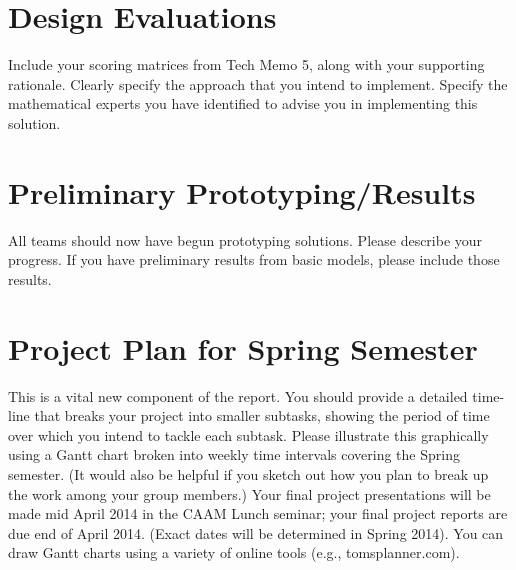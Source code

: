 \documentclass [11pt ]{ report}
\begin{document}
\section{Design Evaluations}
Include your scoring matrices from Tech Memo 5, along with your
supporting rationale. Clearly specify the approach that you intend to implement. Specify the
mathematical experts you have identified to advise you in implementing this solution.

\section{Preliminary Prototyping/Results}
All teams should now have begun prototyping solutions.
Please describe your progress. If you have preliminary results from basic models, please
include those results.

\section{Project Plan for Spring Semester}
This is a vital new component of the report. You should
provide a detailed time-line that breaks your project into smaller subtasks, showing the period
of time over which you intend to tackle each subtask. Please illustrate this graphically
using a Gantt chart broken into weekly time intervals covering the Spring semester. (It would
also be helpful if you sketch out how you plan to break up the work among your group members.)
Your final project presentations will be made mid April 2014 in the CAAM Lunch seminar;
your final project reports are due end of April 2014. (Exact dates will be determined in
Spring 2014).
You can draw Gantt charts using a variety of online tools (e.g., tomsplanner.com).
\end{document}
